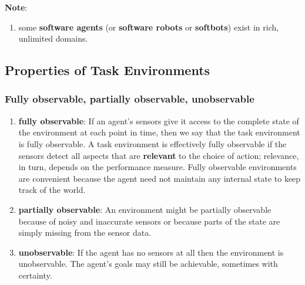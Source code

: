 \vspace{0.3cm}

\textbf{Note}:
\begin{enumerate}
    \item some \textbf{software agents} (or \textbf{software robots} or \textbf{softbots}) exist in rich, unlimited domains. 
    \hfill \cite{ai/book/Artificial-Intelligence-A-Modern-Approach/Russell-Norvig}

    
\end{enumerate}


\clearpage
\subsection{Properties of Task Environments \cite{ai/book/Artificial-Intelligence-A-Modern-Approach/Russell-Norvig}}

\subsubsection{Fully observable, partially observable, unobservable}
\begin{enumerate}
    \item \textbf{fully observable}: If an agent’s sensors give it access to the complete state of the environment at each point in time, then we say that the task environment is fully observable. 
    A task environment is effectively fully observable if the sensors detect all aspects that are \textbf{relevant} to the choice of action; relevance, in turn, depends on the performance measure.
    Fully observable environments are convenient because the agent need not maintain any internal state to keep track of the world. 
    \hfill \cite{ai/book/Artificial-Intelligence-A-Modern-Approach/Russell-Norvig}

    \vspace{0.2cm}

    \item \textbf{partially observable}: An environment might be partially observable because of noisy and inaccurate sensors or because parts of the state are simply missing from the sensor data.
    \hfill \cite{ai/book/Artificial-Intelligence-A-Modern-Approach/Russell-Norvig}

    \vspace{0.2cm}

    \item \textbf{unobservable}: If the agent has no sensors at all then the environment is unobservable. 
    The agent’s goals may still be achievable, sometimes with certainty.
    \hfill \cite{ai/book/Artificial-Intelligence-A-Modern-Approach/Russell-Norvig}
\end{enumerate}


